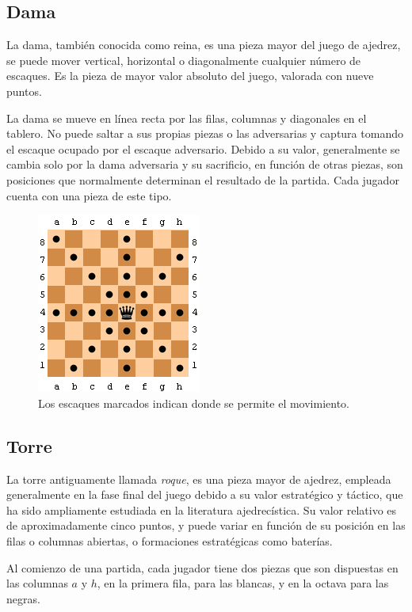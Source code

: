 \subsection{Dama}

La dama, también conocida como reina, es una pieza mayor del juego de ajedrez, se puede mover vertical, horizontal o diagonalmente cualquier número de escaques. Es la pieza de mayor valor absoluto del juego, valorada con nueve puntos. 

La dama se mueve en línea recta por las filas, columnas y diagonales en el tablero. No puede saltar a sus propias piezas o las adversarias y captura tomando el escaque ocupado por el escaque adversario. Debido a su valor, generalmente se cambia solo por la dama adversaria y su sacrificio, en función de otras piezas, son posiciones que normalmente determinan el resultado de la partida.  Cada jugador cuenta con una pieza de este tipo.

\begin{figure}[!h]
	\centering 
	\includegraphics[scale=0.75]{img/movdama}
	\caption{Los escaques marcados indican donde se permite el movimiento.}
	\label{contexto:figuradama}
\end{figure}

\subsection{Torre}

La torre antiguamente llamada \emph{roque}, es una pieza mayor de ajedrez, empleada generalmente en la fase final del juego debido a su valor estratégico y táctico, que ha sido ampliamente estudiada en la literatura ajedrecística. Su valor relativo es de aproximadamente cinco puntos, y puede variar en función de su posición en las filas o columnas abiertas, o formaciones estratégicas como baterías. 

Al comienzo de una partida, cada jugador tiene dos piezas que son dispuestas en las columnas $a$ y $h$, en la primera fila, para las blancas, y en la octava para las negras. 

